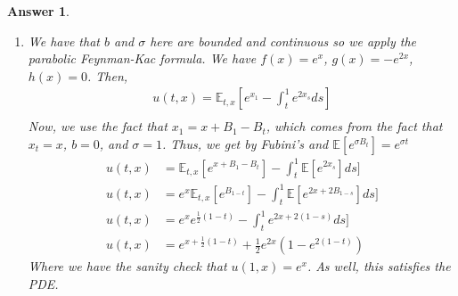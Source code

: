 \documentclass[12pt]{article}
\theoremstyle{colon}
\newtheorem*{answer}{Answer}
\begin{document}
\begin{answer}
  \leavevmode
  \begin{enumerate}[label=\alph*)]
    \item We have that $b$ and $\sigma$ here are bounded and continuous so we apply the parabolic Feynman-Kac formula. We have $f(x) = e^x$, $g(x) = -e^{2x}$, $h(x) = 0$. Then,
      \begin{gather*}
        u(t, x) = \mathbb{E}_{t,x}[e^{x_1} - \int_t^1 e^{2x_s} ds] \\
      \end{gather*}
      Now, we use the fact that $x_1 = x + B_1 - B_t$, which comes from the fact that $x_t = x$, $b = 0$, and $\sigma = 1$. Thus, we get by Fubini's and $\mathbb{E}[e^{\sigma B_t}] = e^{\sigma t}$
      \begin{align*}
        u(t, x) &= \mathbb{E}_{t,x}[e^{x + B_1 - B_t}] - \int_t^1 \mathbb{E}[e^{2x_s}] ds] \\
        u(t, x) &= e^x \mathbb{E}_{t,x}[e^{B_{1-t}}] - \int_t^1 \mathbb{E}[e^{2x + 2B_{1-s}}] ds] \\
        u(t, x) &= e^x e^{\frac{1}{2}(1-t)} - \int_t^1 e^{2x + 2(1-s)} ds] \\
        u(t, x) &= e^{x + \frac{1}{2}(1-t)} + \frac{1}{2} e^{2x} \left( 1 - e^{2(1-t)} \right)
      \end{align*}
      Where we have the sanity check that $u(1,x) = e^x$. As well, this satisfies the PDE.


\end{enumerate}
\end{answer}
\end{document}

